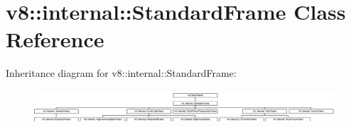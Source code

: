 \hypertarget{classv8_1_1internal_1_1_standard_frame}{}\section{v8\+:\+:internal\+:\+:Standard\+Frame Class Reference}
\label{classv8_1_1internal_1_1_standard_frame}
Inheritance diagram for v8\+:\+:internal\+:\+:Standard\+Frame\+:\begin{figure}[H]
\begin{center}
\leavevmode
\includegraphics[height=1.274900cm]{classv8_1_1internal_1_1_standard_frame}
\end{center}
\end{figure}
